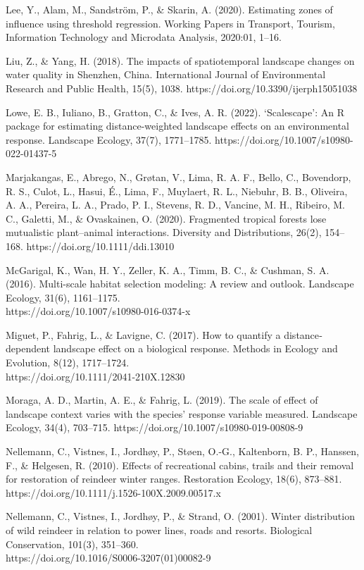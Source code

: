 \documentclass[titlepage]{article}
\begin{document}
Lee, Y., Alam, M., Sandström, P., & Skarin, A. (2020). Estimating zones of influence using threshold regression. Working Papers in Transport, Tourism, Information Technology and Microdata Analysis, 2020:01, 1–16.

Liu, Z., & Yang, H. (2018). The impacts of spatiotemporal landscape changes on water quality in Shenzhen, China. International Journal of Environmental Research and Public Health, 15(5), 1038. https://doi.org/10.3390/ijerph15051038

Lowe, E. B., Iuliano, B., Gratton, C., & Ives, A. R. (2022). ‘Scalescape’: An R package for estimating distance-weighted landscape effects on an environmental response. Landscape Ecology, 37(7), 1771–1785. https://doi.org/10.1007/s10980-022-01437-5

Marjakangas, E., Abrego, N., Grøtan, V., Lima, R. A. F., Bello, C., Bovendorp, R. S., Culot, L., Hasui, É., Lima, F., Muylaert, R. L., Niebuhr, B. B., Oliveira, A. A., Pereira, L. A., Prado, P. I., Stevens, R. D., Vancine, M. H., Ribeiro, M. C., Galetti, M., & Ovaskainen, O. (2020). Fragmented tropical forests lose mutualistic plant–animal interactions. Diversity and Distributions, 26(2), 154–168. https://doi.org/10.1111/ddi.13010

McGarigal, K., Wan, H. Y., Zeller, K. A., Timm, B. C., & Cushman, S. A. (2016). Multi-scale habitat selection modeling: A review and outlook. Landscape Ecology, 31(6), 1161–1175.\\ https://doi.org/10.1007/s10980-016-0374-x

Miguet, P., Fahrig, L., & Lavigne, C. (2017). How to quantify a distance‐dependent landscape effect on a biological response. Methods in Ecology and Evolution, 8(12), 1717–1724. \\
https://doi.org/10.1111/2041-210X.12830

Moraga, A. D., Martin, A. E., & Fahrig, L. (2019). The scale of effect of landscape context varies with the species’ response variable measured. Landscape Ecology, 34(4), 703–715. https://doi.org/10.1007/s10980-019-00808-9

Nellemann, C., Vistnes, I., Jordhøy, P., Støen, O.-G., Kaltenborn, B. P., Hanssen, F., & Helgesen, R. (2010). Effects of recreational cabins, trails and their removal for restoration of reindeer winter ranges. Restoration Ecology, 18(6), 873–881. https://doi.org/10.1111/j.1526-100X.2009.00517.x

Nellemann, C., Vistnes, I., Jordhøy, P., & Strand, O. (2001). Winter distribution of wild reindeer in relation to power lines, roads and resorts. Biological Conservation, 101(3), 351–360.\\ https://doi.org/10.1016/S0006-3207(01)00082-9
\end{document}
